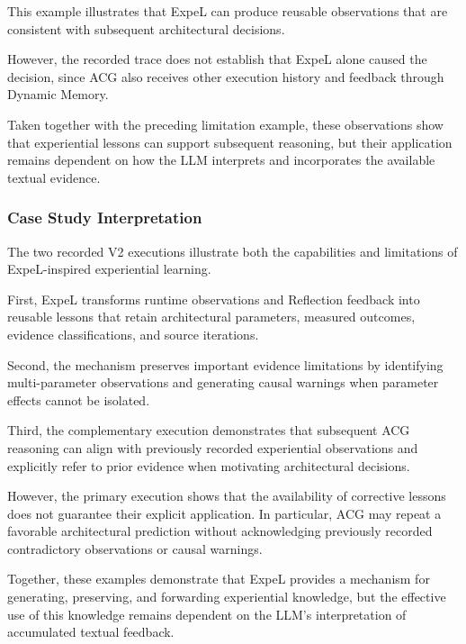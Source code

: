This example illustrates that ExpeL can
produce reusable observations that are
consistent with subsequent architectural
decisions.

However, the recorded trace does not
establish that ExpeL alone caused the
decision, since ACG also receives other
execution history and feedback through
Dynamic Memory.

Taken together with the preceding
limitation example, these observations
show that experiential lessons can
support subsequent reasoning, but their
application remains dependent on how
the LLM interprets and incorporates
the available textual evidence.



\subsubsection{Case Study Interpretation}

The two recorded V2 executions illustrate
both the capabilities and limitations of
ExpeL-inspired experiential learning.

First, ExpeL transforms runtime observations
and Reflection feedback into reusable lessons
that retain architectural parameters,
measured outcomes, evidence classifications,
and source iterations.

Second, the mechanism preserves important
evidence limitations by identifying
multi-parameter observations and generating
causal warnings when parameter effects
cannot be isolated.

Third, the complementary execution
demonstrates that subsequent ACG reasoning
can align with previously recorded
experiential observations and explicitly
refer to prior evidence when motivating
architectural decisions.

However, the primary execution shows that
the availability of corrective lessons
does not guarantee their explicit application.
In particular, ACG may repeat a favorable
architectural prediction without acknowledging
previously recorded contradictory observations
or causal warnings.

Together, these examples demonstrate that
ExpeL provides a mechanism for generating,
preserving, and forwarding experiential
knowledge, but the effective use of this
knowledge remains dependent on the LLM's
interpretation of accumulated textual feedback.


